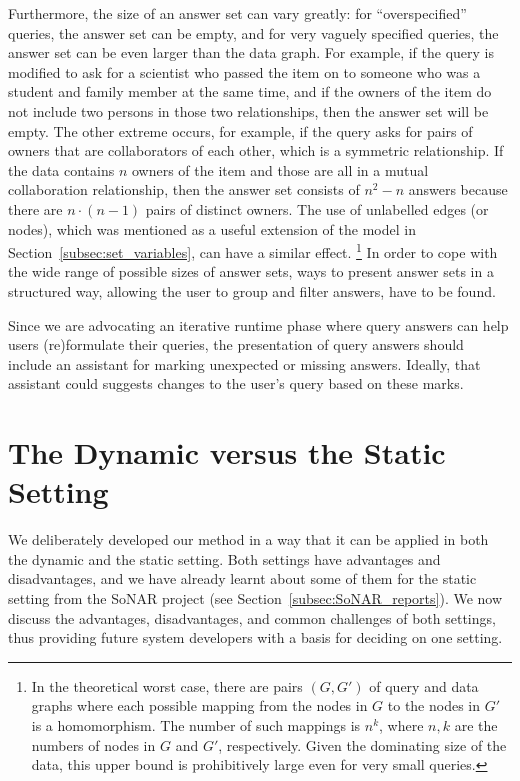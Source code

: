 Furthermore, the size of an answer set can vary greatly: for \enquote{overspecified} queries, the answer set can be empty,
and for very vaguely specified queries, the answer set can be even larger than the data graph.
For example, if the query  is modified to ask for a scientist who passed the item on
to someone who was a student and family member at the same time, and if the owners of the item
do not include two persons in those two relationships, then the answer set will be empty.
The other extreme occurs, for example, if the query asks for pairs of owners that are collaborators of each other,
which is a symmetric relationship. If the data contains $n$ owners of the item and those are all in a mutual collaboration relationship,
then the answer set consists of $n^2 - n$ answers because there are $n \cdot (n-1)$ pairs of distinct owners.
The use of unlabelled edges (or nodes), which was mentioned as a useful extension of the model in Section~\ref{subsec:set_variables},
can have a similar effect.%
\footnote{%
  In the theoretical worst case, there are pairs $(G,G')$ of query and data graphs
  where each possible mapping from the nodes in $G$
  to the nodes in $G'$ is a homomorphism. The number of such mappings is $n^k$,
  where $n,k$ are the numbers of nodes in $G$ and $G'$, respectively.
  Given the dominating size of the data, this upper bound is prohibitively large even for very small queries.%
}
In order to cope with the wide range of possible sizes of answer sets,
ways to present answer sets in a structured way,
allowing the user to group and filter answers, have to be found.

Since we are advocating an iterative runtime phase where query answers can help users (re)for\-mu\-late their queries,
the presentation of query answers should include an assistant for marking unexpected or missing answers.
Ideally, that assistant could suggests changes to the user's query based on these marks.

\section{The Dynamic versus the Static Setting}
\label{sec:dynamic_vs_static}

We deliberately developed our method in a way that it can be applied
in both the dynamic and the static setting.
Both settings have advantages and disadvantages,
and we have already learnt about some of them for the static setting
from the SoNAR project (see Section~\ref{subsec:SoNAR_reports}).
We now discuss the advantages, disadvantages, and common challenges of both settings,
thus providing future system developers with a basis for deciding on one setting.

